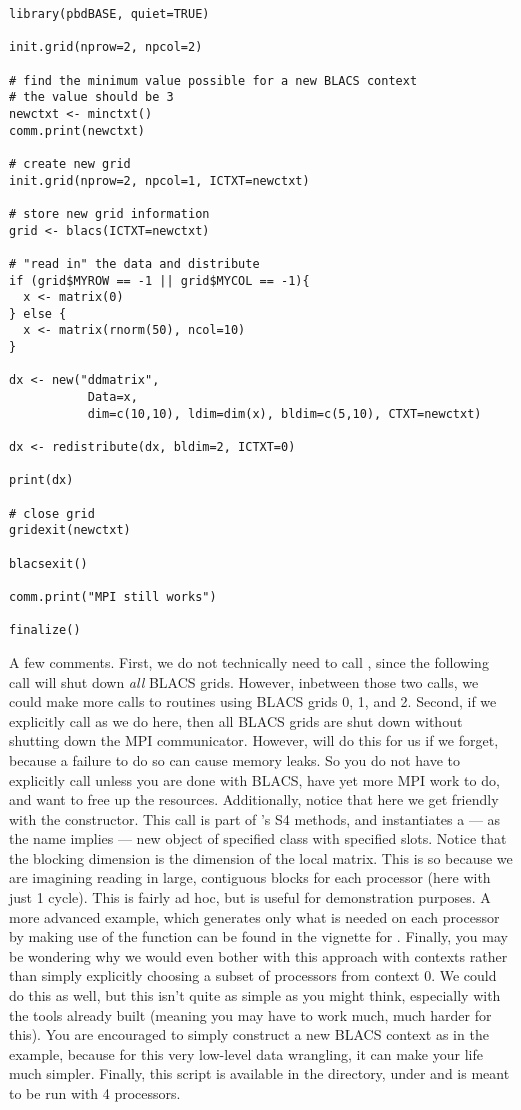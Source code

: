 \begin{lstlisting}[language=rr,title=Generating in Parallel]
library(pbdBASE, quiet=TRUE)

init.grid(nprow=2, npcol=2)

# find the minimum value possible for a new BLACS context
# the value should be 3
newctxt <- minctxt()
comm.print(newctxt)

# create new grid
init.grid(nprow=2, npcol=1, ICTXT=newctxt)

# store new grid information
grid <- blacs(ICTXT=newctxt)

# "read in" the data and distribute
if (grid$MYROW == -1 || grid$MYCOL == -1){
  x <- matrix(0)
} else {
  x <- matrix(rnorm(50), ncol=10)
}

dx <- new("ddmatrix", 
           Data=x, 
           dim=c(10,10), ldim=dim(x), bldim=c(5,10), CTXT=newctxt)

dx <- redistribute(dx, bldim=2, ICTXT=0)

print(dx)

# close grid
gridexit(newctxt)

blacsexit()

comm.print("MPI still works")

finalize()
\end{lstlisting}

A few comments.  First, we do not technically need to call , since the following  call will shut down \emph{all} BLACS grids.  However, inbetween those two calls, we could make more calls to routines using BLACS grids 0, 1, and 2.  Second, if we explicitly call  as we do here, then all BLACS grids are shut down without shutting down the MPI communicator.  However,  will do this for us if we forget, because a failure to do so can cause memory leaks.  So you do not have to explicitly call  unless you are done with BLACS, have yet more MPI work to do, and want to free up the resources.
\np
Additionally, notice that here we get friendly with the  constructor.  This call is part of 's S4 methods, and instantiates a --- as the name implies --- new object of specified class with specified slots.  Notice that the blocking dimension is the dimension of the local matrix.  This is so because we are imagining reading in large, contiguous blocks for each processor (here with just 1 cycle).  This is fairly ad hoc, but is useful for demonstration purposes.  A more advanced example, which generates only what is needed on each processor by making use of the function  can be found in the vignette for .
\np
Finally, you may be wondering why we would even bother with this approach with contexts rather than simply explicitly choosing a subset of processors from context 0.  We could do this as well, but this isn't quite as simple as you might think, especially with the tools already built (meaning you may have to work much, much harder for this).  You are encouraged to simply construct a new BLACS context as in the example, because for this very low-level data wrangling, it can make your life much simpler.
\np
Finally, this script is available in the  directory, under  and is meant to be run with 4 processors.